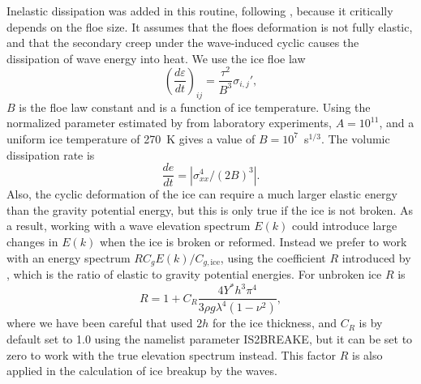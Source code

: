 Inelastic dissipation was added in this routine, following \cite{art:Wad73}, because it critically 
depends on the floe size.  It assumes that the floes deformation is not fully elastic, and that the secondary creep under the wave-induced cyclic causes the dissipation of wave energy into heat. 
We use the ice floe law
\begin{equation}
\left(\frac{d\varepsilon}{dt}\right)_{ij}=\frac{\tau^2}{B^3}\sigma_{i,j}',
\end{equation}
$B$ is the floe law  constant and is a function of ice temperature. Using the normalized parameter estimated by \cite{art:Cea98} from 
laboratory experiments, $A=10^{11}$,  and  a uniform ice temperature of 270~K  gives a value 
of $B=10^7$~s$^{1/3}$. The volumic dissipation rate is 
\begin{equation}
\frac{de}{dt}= | \sigma_{xx}^{4}/(2B)^3 |.
\end{equation}
Also, the cyclic deformation of the ice can require a much larger elastic energy than the gravity potential 
energy, but this is only true if the ice is not broken. As a result, working with a wave elevation spectrum $E(k)$ 
could introduce large changes in $E(k)$ when the ice is broken or reformed. Instead we prefer 
to work with an energy spectrum $ R C_g E(k)/C_{g,\mathrm{ice}}$, using the coefficient $R$ introduced by \cite{art:Wad73}, which 
is the ratio of elastic to gravity potential energies. 
For unbroken ice  $R$ is 
\begin{equation}
R=1+C_R\frac{4Y^*h^3\pi^4}{3\rho g \lambda^4(1-\nu^2)},
\label{R}
\end{equation}
where we have been careful that \cite{art:Wad73} used $2h$ for the  ice thickness, 
and $C_R$ is by default set to 1.0 using the namelist parameter {\code IS2BREAKE}, but it can 
be set to zero to work with the true elevation spectrum instead. This factor $R$ is also 
applied in the calculation of ice breakup by the waves.\\


